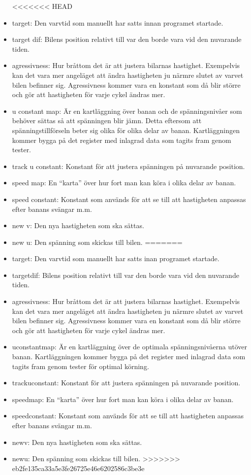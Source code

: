 \begin{itemize}
<<<<<<< HEAD
      \item target: Den varvtid som manuellt har satts innan programet startade.
      \item target dif: Bilens position relativt till var den borde vara vid den nuvarande tiden.
      \item agressivness: Hur bråttom det är att justera bilarnas hastighet. Exempelvis kan det vara mer angeläget att ändra hastigheten ju närmre slutet av varvet bilen befinner sig. Agressivness kommer vara en konstant som då blir större och gör att hastigheten för varje cykel ändras mer.
      \item u constant map: Är en kartläggning över banan och de spänningsnivåer som behöver sättas så att spänningen blir jämn. Detta eftersom att spänningstillförseln beter sig olika för olika delar av banan. Kartläggningen kommer bygga på det register med inlagrad data som tagits fram genom tester.
      \item track u constant: Konstant för att justera spänningen på nuvarande position.
      \item speed map: En ``karta'' över hur fort man kan köra i olika delar av banan.
      \item speed constant: Konstant som används för att se till att hastigheten anpassas efter banans svängar m.m.
      \item new v: Den nya hastigheten som ska sättas.
      \item new u: Den spänning som skickas till bilen.
=======
      \item target: Den varvtid som manuellt har satts inan programet startade.
      \item target\textunderscore dif: Bilens position relativt till var den borde vara vid den nuvarande tiden.
      \item agressivness: Hur bråttom det är att justera bilarnas hastighet. Exempelvis kan det vara mer angeläget att ändra hastigheten ju närmre slutet av varvet bilen befinner sig. Agressivness kommer vara en konstant som då blir större och gör att hastigheten för varje cykel ändras mer.
      \item u\textunderscore constant\textunderscore map: Är en kartläggning över de optimala spänningsnivåerna utöver banan. Kartläggningen kommer bygga på det register med inlagrad data som tagits fram genom tester för optimal körning.
      \item track\textunderscore u\textunderscore constant: Konstant för att justera spänningen på nuvarande position.
      \item speed\textunderscore map: En ``karta'' över hur fort man kan köra i olika delar av banan.
      \item speed\textunderscore constant: Konstant som används för att se till att hastigheten anpassas efter banans svängar m.m.
      \item new\textunderscore v: Den nya hastigheten som ska sättas.
      \item new\textunderscore u: Den spänning som skickas till bilen.
>>>>>>> eb2fe135ca33a5e3fe26725e46e6202586c3be3e
    \end{itemize}

